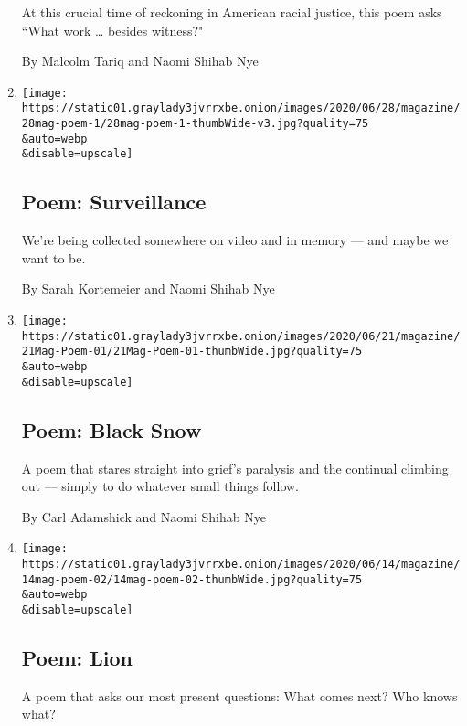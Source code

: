 \begin{enumerate}
  At this crucial time of reckoning in American racial justice, this
  poem asks ``What work \ldots{} besides witness?"

  By Malcolm Tariq and Naomi Shihab Nye
\item
  \href{/2020/06/25/magazine/poem-surveillance.html}{}

  \texttt{[image: https://static01.graylady3jvrrxbe.onion/images/2020/06/28/magazine/28mag-poem-1/28mag-poem-1-thumbWide-v3.jpg?quality=75\\\&auto=webp\\\&disable=upscale]}

  \hypertarget{poem-surveillance}{%
  \subsection{Poem: Surveillance}\label{poem-surveillance}}

  We're being collected somewhere on video and in memory --- and maybe
  we want to be.

  By Sarah Kortemeier and Naomi Shihab Nye
\item
  \href{/2020/06/18/magazine/poem-black-snow.html}{}

  \texttt{[image: https://static01.graylady3jvrrxbe.onion/images/2020/06/21/magazine/21Mag-Poem-01/21Mag-Poem-01-thumbWide.jpg?quality=75\\\&auto=webp\\\&disable=upscale]}

  \hypertarget{poem-black-snow}{%
  \subsection{Poem: Black Snow}\label{poem-black-snow}}

  A poem that stares straight into grief's paralysis and the continual
  climbing out --- simply to do whatever small things follow.

  By Carl Adamshick and Naomi Shihab Nye
\item
  \href{/2020/06/11/magazine/poem-lion.html}{}

  \texttt{[image: https://static01.graylady3jvrrxbe.onion/images/2020/06/14/magazine/14mag-poem-02/14mag-poem-02-thumbWide.jpg?quality=75\\\&auto=webp\\\&disable=upscale]}

  \hypertarget{poem-lion}{%
  \subsection{Poem: Lion}\label{poem-lion}}

  A poem that asks our most present questions: What comes next? Who
  knows what?


\end{enumerate}
